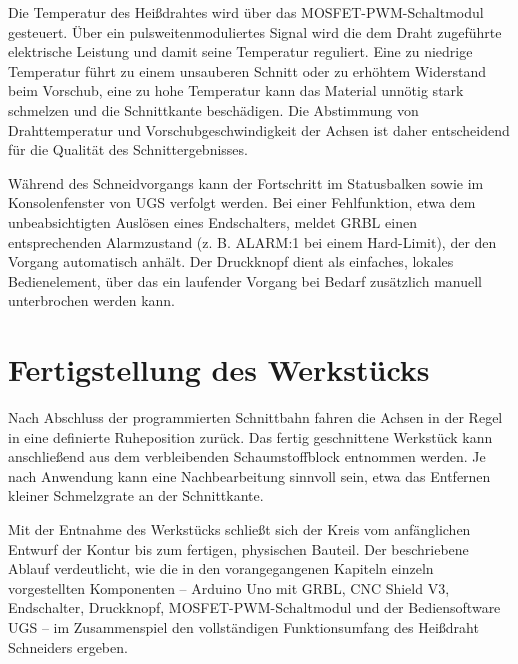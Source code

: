 Die Temperatur des Heißdrahtes wird über das MOSFET-PWM-Schaltmodul
gesteuert. Über ein pulsweitenmoduliertes Signal wird die dem Draht
zugeführte elektrische Leistung und damit seine Temperatur reguliert.
Eine zu niedrige Temperatur führt zu einem unsauberen Schnitt oder zu
erhöhtem Widerstand beim Vorschub, eine zu hohe Temperatur kann das
Material unnötig stark schmelzen und die Schnittkante beschädigen. Die
Abstimmung von Drahttemperatur und Vorschubgeschwindigkeit der Achsen
ist daher entscheidend für die Qualität des Schnittergebnisses.

Während des Schneidvorgangs kann der Fortschritt im Statusbalken sowie
im Konsolenfenster von UGS verfolgt werden. Bei einer Fehlfunktion, etwa
dem unbeabsichtigten Auslösen eines Endschalters, meldet GRBL einen
entsprechenden Alarmzustand (z. B. ALARM:1 bei einem Hard-Limit), der
den Vorgang automatisch anhält. Der Druckknopf dient als einfaches,
lokales Bedienelement, über das ein laufender Vorgang bei Bedarf
zusätzlich manuell unterbrochen werden kann.

\section{Fertigstellung des Werkstücks}

Nach Abschluss der programmierten Schnittbahn fahren die Achsen in der
Regel in eine definierte Ruheposition zurück. Das fertig geschnittene
Werkstück kann anschließend aus dem verbleibenden Schaumstoffblock
entnommen werden. Je nach Anwendung kann eine Nachbearbeitung sinnvoll
sein, etwa das Entfernen kleiner Schmelzgrate an der Schnittkante.

Mit der Entnahme des Werkstücks schließt sich der Kreis vom anfänglichen
Entwurf der Kontur bis zum fertigen, physischen Bauteil. Der
beschriebene Ablauf verdeutlicht, wie die in den vorangegangenen
Kapiteln einzeln vorgestellten Komponenten -- Arduino Uno mit GRBL, CNC
Shield V3, Endschalter, Druckknopf, MOSFET-PWM-Schaltmodul und der
Bediensoftware UGS -- im Zusammenspiel den vollständigen Funktionsumfang
des Heißdraht Schneiders ergeben.


